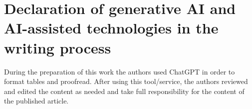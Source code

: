 \documentclass[preprint,12pt, authoryear]{elsarticle}
\begin{document}
\section*{Declaration of generative AI and AI-assisted technologies in the writing process}
During the preparation of this work the authors used ChatGPT in order to format tables and proofread. After using this tool/service, the authors reviewed and edited the content as needed and take full responsibility for the content of the published article.

\clearpage
%



\end{document}
